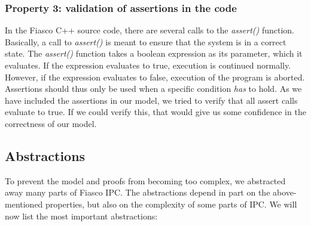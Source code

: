 \subsubsection{Property 3: validation of assertions in the code}
In the Fiasco C++ source code, there are several calls to the \emph{assert()} function. Basically, a call to \emph{assert()} is meant to ensure that the system is in a correct state. The \emph{assert()} function takes a boolean expression as its parameter, which it evaluates. If the expression evaluates to true, execution is continued normally. However, if the expression evaluates to false, execution of the program is aborted. Assertions should thus only be used when a specific condition \textit{has} to hold. As we have included the assertions in our model, we tried to verify that all assert calls evaluate to true. If we could verify this, that would give us some confidence in the correctness of our model.

\subsection{Abstractions}
To prevent the model and proofs from becoming too complex, we abstracted away many parts of Fiasco IPC. The abstractions depend in part on the above-mentioned properties, but also on the complexity of some parts of IPC. We will now list the most important abstractions:

